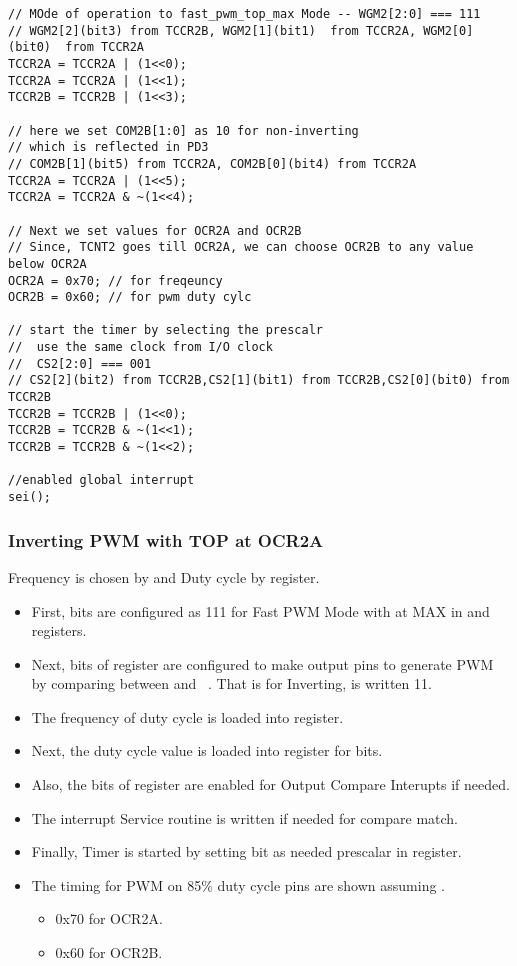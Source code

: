 \begin{verbatim}
// MOde of operation to fast_pwm_top_max Mode -- WGM2[2:0] === 111
// WGM2[2](bit3) from TCCR2B, WGM2[1](bit1)  from TCCR2A, WGM2[0](bit0)  from TCCR2A
TCCR2A = TCCR2A | (1<<0);
TCCR2A = TCCR2A | (1<<1);
TCCR2B = TCCR2B | (1<<3);	

// here we set COM2B[1:0] as 10 for non-inverting
// which is reflected in PD3
// COM2B[1](bit5) from TCCR2A, COM2B[0](bit4) from TCCR2A
TCCR2A = TCCR2A | (1<<5);
TCCR2A = TCCR2A & ~(1<<4);

// Next we set values for OCR2A and OCR2B
// Since, TCNT2 goes till OCR2A, we can choose OCR2B to any value below OCR2A
OCR2A = 0x70; // for freqeuncy
OCR2B = 0x60; // for pwm duty cylc

// start the timer by selecting the prescalr
//  use the same clock from I/O clock
//  CS2[2:0] === 001
// CS2[2](bit2) from TCCR2B,CS2[1](bit1) from TCCR2B,CS2[0](bit0) from TCCR2B
TCCR2B = TCCR2B | (1<<0);
TCCR2B = TCCR2B & ~(1<<1);
TCCR2B = TCCR2B & ~(1<<2);

//enabled global interrupt
sei();
\end{verbatim}

\subsubsection{Inverting PWM with TOP at  OCR2A}
\quad Frequency is chosen by  and Duty cycle by  register.
\begin{itemize}
    \item First,  bits are configured as 111 for Fast PWM Mode with  at MAX in  and  registers.
    \item Next,  bits of  register are configured to make output  pins to generate PWM by comparing between  and \ . That is for Inverting,  is written 11.
    \item The frequency of duty cycle is loaded into  register.
    \item Next, the duty cycle value is loaded into  register for  bits.
    \item Also, the  bits of  register  are enabled for Output Compare Interupts if needed.
    \item The interrupt Service routine is written if needed for compare match.
    \item Finally, Timer is started by setting  bit as needed prescalar in  register.
    \item The timing for PWM on 85\% duty cycle  pins are shown assuming .
    \begin{itemize}
        \item 0x70 for OCR2A.
        \item 0x60 for OCR2B.
    \end{itemize}
\end{itemize}

